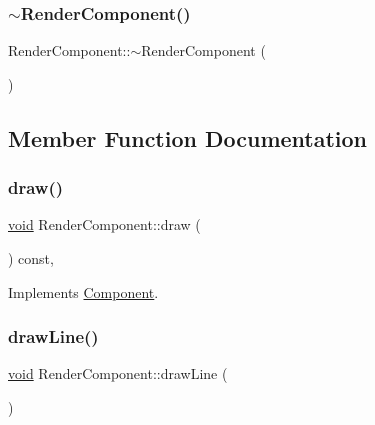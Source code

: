 \subsubsection{\texorpdfstring{$\sim$\+Render\+Component()}{~RenderComponent()}}
{\footnotesize\ttfamily Render\+Component\+::$\sim$\+Render\+Component (\begin{DoxyParamCaption}{ }\end{DoxyParamCaption})}



\subsection{Member Function Documentation}
\mbox{\label{classRenderComponent_af2bf016f9a929d97b4c0c31db8e3842f}} 
\subsubsection{\texorpdfstring{draw()}{draw()}}
{\footnotesize\ttfamily \hyperlink{imgui__impl__opengl3__loader_8h_ac668e7cffd9e2e9cfee428b9b2f34fa7}{void} Render\+Component\+::draw (\begin{DoxyParamCaption}{ }\end{DoxyParamCaption}) const\hspace{0.3cm}{\ttfamily [override]}, {\ttfamily [virtual]}}



Implements \hyperlink{classComponent_a8f45309003f02191f2bcc8864e8e9ecf}{Component}.

\mbox{\label{classRenderComponent_a2413b8e4fc53c6f41984b173187577a9}} 
\subsubsection{\texorpdfstring{draw\+Line()}{drawLine()}\hspace{0.1cm}{\footnotesize\ttfamily [1/2]}}
{\footnotesize\ttfamily \hyperlink{imgui__impl__opengl3__loader_8h_ac668e7cffd9e2e9cfee428b9b2f34fa7}{void} Render\+Component\+::draw\+Line (\begin{DoxyParamCaption}{ }\end{DoxyParamCaption})}

